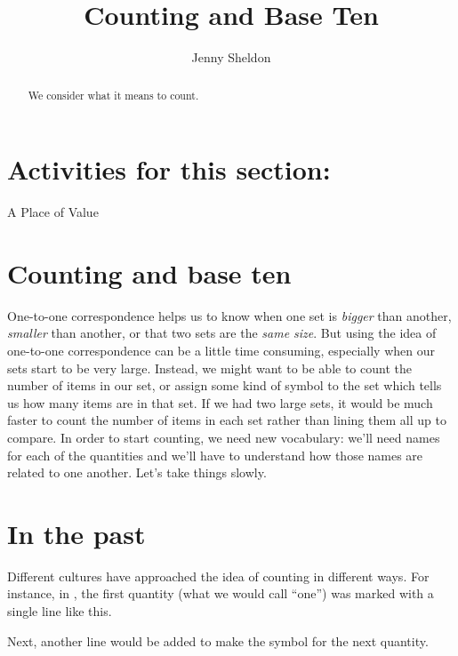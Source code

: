 \documentclass{ximera}
\title{Counting and Base Ten}
\author{Jenny Sheldon}
\begin{document}
\begin{abstract}
We consider what it means to count.
\end{abstract}
\maketitle

\section{Activities for this section:} A Place of Value


\section{Counting and base ten}

One-to-one correspondence helps us to know when one set is {\em bigger} than another, {\em smaller} than another, or that two sets are the {\em same size}. But using the idea of one-to-one correspondence can be a little time consuming, especially when our sets start to be very large. Instead, we might want to be able to count the number of items in our set, or assign some kind of symbol to the set which tells us how many items are in that set. If we had two large sets, it would be much faster to count the number of items in each set rather than lining them all up to compare. In order to start counting, we need new vocabulary: we'll need names for each of the quantities and we'll have to understand how those names are related to one another. Let's take things slowly.

\section{In the past} 

Different cultures have approached the idea of counting in different ways. For instance, in , the first quantity (what we would call ``one'') was marked with a single line like this.


\begin{image}
\end{image}



Next, another line would be added to make the symbol for the next quantity.
\end{document}
